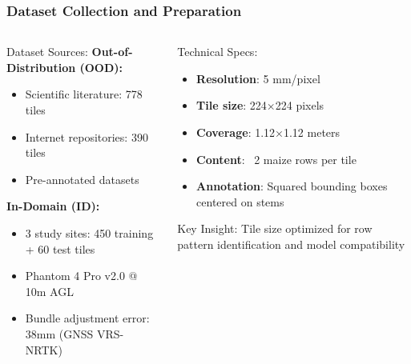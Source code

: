 \documentclass[aspectratio=43]{beamer}
\begin{document}
\begin{frame}
    \frametitle{Dataset Collection and Preparation}
    
    \begin{columns}
        \begin{column}{0.6\textwidth}
            \begin{block}{Dataset Sources:}
                \small
                \textbf{Out-of-Distribution (OOD):}
                \begin{itemize}
                    \item Scientific literature: 778 tiles
                    \item Internet repositories: 390 tiles
                    \item Pre-annotated datasets
                \end{itemize}
                
                \textbf{In-Domain (ID):}
                \begin{itemize}
                    \item 3 study sites: 450 training + 60 test tiles
                    \item Phantom 4 Pro v2.0 @ 10m AGL
                    \item Bundle adjustment error: 38mm (GNSS VRS-NRTK)
                \end{itemize}
            \end{block}
        \end{column}
        
        \begin{column}{0.4\textwidth}
            \begin{block}{Technical Specs:}
                \small
                \begin{itemize}
                    \item \textbf{Resolution}: 5 mm/pixel
                    \item \textbf{Tile size}: 224×224 pixels
                    \item \textbf{Coverage}: 1.12×1.12 meters
                    \item \textbf{Content}: ~2 maize rows per tile
                    \item \textbf{Annotation}: Squared bounding boxes centered on stems
                \end{itemize}
            \end{block}
            
            \begin{alertblock}{\small Key Insight:}
                \small Tile size optimized for row pattern identification and model compatibility
            \end{alertblock}
        \end{column}
    \end{columns}
\end{frame}
\end{document}
